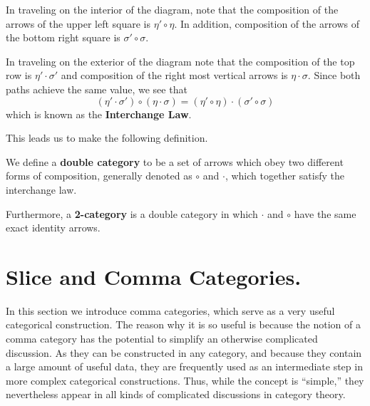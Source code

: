     In traveling on the interior of the diagram, 
    note that the composition of the arrows of the upper left square
    is $\eta' \circ \eta$. In addition, composition of the arrows of
    the bottom right square is $\sigma' \circ \sigma$. 

    In traveling on the exterior of the diagram note that the
    composition of the top row is  $\eta' \cdot \sigma'$  and
    composition of the right most vertical arrows is $\eta \cdot
    \sigma$. Since both paths achieve the same value, we see that 
    \[
        (\eta' \cdot \sigma') \circ (\eta \cdot \sigma)
        =  (\eta' \circ \eta) \cdot (\sigma' \circ \sigma)
    \]
    which is known as the \textbf{Interchange Law}.

    This leads us to make the following definition.

    \begin{definition}
        We define a \textbf{double category} to be a set of arrows
        which obey two different forms of composition, generally
        denoted as $\circ$ and $\cdot$, which together satisfy the
        interchange law. 

        Furthermore, a \textbf{2-category} is a double category in
        which $\cdot$ and $\circ$ have the same exact identity arrows.
        
    \end{definition}


    

    \newpage
    \section{Slice and Comma Categories.}
    In this section we introduce comma categories, which serve as 
    a very useful categorical construction. The reason why it is so useful is 
    because the notion of a comma category has 
    the potential to simplify an otherwise complicated discussion. 
    As they can be constructed in any category, and 
    because they contain a large amount of useful data,
    they are frequently used as an intermediate step in 
    more complex categorical constructions. Thus, while the concept 
    is ``simple,'' they nevertheless appear in all kinds of complicated
    discussions in category theory.

